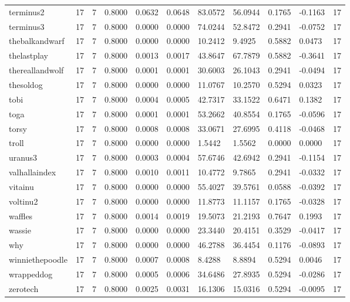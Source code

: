 \begin{table}[htbp]
\begin{tabular}{lllllllllll}
terminus2 & 17 & 7 & 0.8000 & 0.0632 & 0.0648 & 83.0572 & 56.0944 & 0.1765 & -0.1163 & 17 \\
terminus3 & 17 & 7 & 0.8000 & 0.0000 & 0.0000 & 74.0244 & 52.8472 & 0.2941 & -0.0752 & 17 \\
thebalkandwarf & 17 & 7 & 0.8000 & 0.0000 & 0.0000 & 10.2412 & 9.4925 & 0.5882 & 0.0473 & 17 \\
thelastplay & 17 & 7 & 0.8000 & 0.0013 & 0.0017 & 43.8647 & 67.7879 & 0.5882 & -0.3641 & 17 \\
thereallandwolf & 17 & 7 & 0.8000 & 0.0001 & 0.0001 & 30.6003 & 26.1043 & 0.2941 & -0.0494 & 17 \\
thesoldog & 17 & 7 & 0.8000 & 0.0000 & 0.0000 & 11.0767 & 10.2570 & 0.5294 & 0.0323 & 17 \\
tobi & 17 & 7 & 0.8000 & 0.0004 & 0.0005 & 42.7317 & 33.1522 & 0.6471 & 0.1382 & 17 \\
toga & 17 & 7 & 0.8000 & 0.0001 & 0.0001 & 53.2662 & 40.8554 & 0.1765 & -0.0596 & 17 \\
torsy & 17 & 7 & 0.8000 & 0.0008 & 0.0008 & 33.0671 & 27.6995 & 0.4118 & -0.0468 & 17 \\
troll & 17 & 7 & 0.8000 & 0.0000 & 0.0000 & 1.5442 & 1.5562 & 0.0000 & 0.0000 & 17 \\
uranus3 & 17 & 7 & 0.8000 & 0.0003 & 0.0004 & 57.6746 & 42.6942 & 0.2941 & -0.1154 & 17 \\
valhallaindex & 17 & 7 & 0.8000 & 0.0010 & 0.0011 & 10.4772 & 9.7865 & 0.2941 & -0.0332 & 17 \\
vitainu & 17 & 7 & 0.8000 & 0.0000 & 0.0000 & 55.4027 & 39.5761 & 0.0588 & -0.0392 & 17 \\
voltinu2 & 17 & 7 & 0.8000 & 0.0000 & 0.0000 & 11.8773 & 11.1157 & 0.1765 & -0.0328 & 17 \\
waffles & 17 & 7 & 0.8000 & 0.0014 & 0.0019 & 19.5073 & 21.2193 & 0.7647 & 0.1993 & 17 \\
wassie & 17 & 7 & 0.8000 & 0.0000 & 0.0000 & 23.3440 & 20.4151 & 0.3529 & -0.0417 & 17 \\
why & 17 & 7 & 0.8000 & 0.0000 & 0.0000 & 46.2788 & 36.4454 & 0.1176 & -0.0893 & 17 \\
winniethepoodle & 17 & 7 & 0.8000 & 0.0007 & 0.0008 & 8.4288 & 8.8894 & 0.5294 & 0.0046 & 17 \\
wrappeddog & 17 & 7 & 0.8000 & 0.0005 & 0.0006 & 34.6486 & 27.8935 & 0.5294 & -0.0286 & 17 \\
zerotech & 17 & 7 & 0.8000 & 0.0025 & 0.0031 & 16.1306 & 15.0316 & 0.5294 & -0.0095 & 17 \\

\end{tabular}
\end{table}
